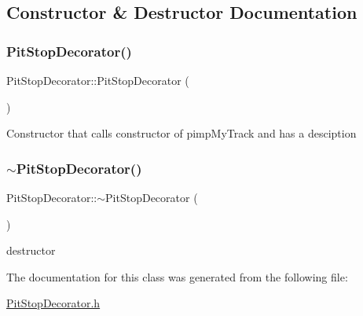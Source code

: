 \subsection{Constructor \& Destructor Documentation}
\mbox{\label{class_pit_stop_decorator_afbae05423e77985887244313e751393d}} 
\subsubsection{\texorpdfstring{Pit\+Stop\+Decorator()}{PitStopDecorator()}}
{\footnotesize\ttfamily Pit\+Stop\+Decorator\+::\+Pit\+Stop\+Decorator (\begin{DoxyParamCaption}{ }\end{DoxyParamCaption})\hspace{0.3cm}{\ttfamily [inline]}}

Constructor that calls constructor of pimp\+My\+Track and has a desciption \mbox{\label{class_pit_stop_decorator_a9921ee34d21b5a77072fd2465ae05b55}} 
\subsubsection{\texorpdfstring{$\sim$\+Pit\+Stop\+Decorator()}{~PitStopDecorator()}}
{\footnotesize\ttfamily Pit\+Stop\+Decorator\+::$\sim$\+Pit\+Stop\+Decorator (\begin{DoxyParamCaption}{ }\end{DoxyParamCaption})\hspace{0.3cm}{\ttfamily [inline]}}

destructor 

The documentation for this class was generated from the following file\+:\begin{DoxyCompactItemize}
\item 
\mbox{\hyperlink{_pit_stop_decorator_8h}{Pit\+Stop\+Decorator.\+h}}\end{DoxyCompactItemize}
